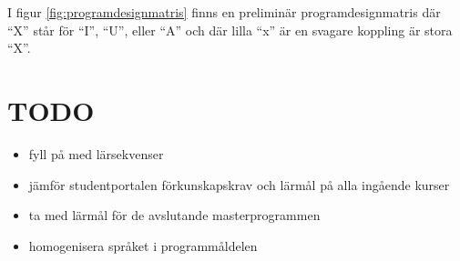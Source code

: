 \documentclass[twocolumn]{article}
\begin{document}
I figur \ref{fig:programdesignmatris} finns en preliminär
programdesignmatris där ``X'' står för ``I'', ``U'', eller ``A'' och
där lilla ``x'' är en svagare koppling är stora ``X''.

\appendix

% 
\section{TODO}
\begin{itemize}
\item fyll på med lärsekvenser
\item jämför studentportalen förkunskapskrav och lärmål på alla ingående kurser
\item ta med lärmål för de avslutande masterprogrammen
\item homogenisera språket i programmåldelen
\end{itemize}

\end{document}
